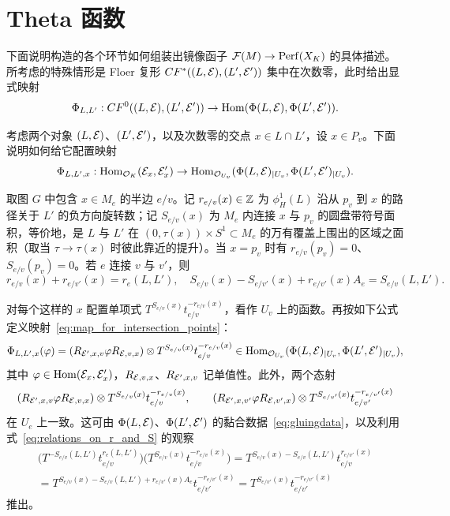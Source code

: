 \section{Theta 函数}\label{ss:theta}

下面说明构造的各个环节如何组装出镜像函子 $\mathcal{F}(M)\to \operatorname{Perf}(X_K)$ 的具体描述。所考虑的特殊情形是 Floer 复形 $CF^*((L,\mathcal{E}),(L',\mathcal{E}'))$ 集中在次数零，此时给出显式映射
\begin{equation}\label{eq:theta}
\Phi_{L,L'}:CF^0((L,\mathcal{E}),(L',\mathcal{E}'))\to \operatorname{Hom}(\Phi(L,\mathcal{E}),\Phi(L',\mathcal{E}')).
\end{equation}

考虑两个对象 $(L,\mathcal{E})$、$(L',\mathcal{E}')$，以及次数零的交点 $x\in L\cap L'$，设 $x\in P_v$。下面说明如何给它配置映射
\begin{equation}\label{eq:map_for_intersection_points}
\Phi_{L,L',x}:\operatorname{Hom}_{\mathcal{O}_K}(\mathcal{E}_x,\mathcal{E}'_x)\to \operatorname{Hom}_{\mathcal{O}_{U_v}}(\Phi(L,\mathcal{E})_{\mid U_v},\Phi(L',\mathcal{E}')_{\mid U_v}).
\end{equation}

取图 $G$ 中包含 $x\in M_e$ 的半边 $e/v$。记 $r_{e/v}(x)\in \mathbb{Z}$ 为 $\phi_H^1(L)$ 沿从 $p_v$ 到 $x$ 的路径关于 $L'$ 的负方向旋转数；记 $S_{e/v}(x)$ 为 $M_e$ 内连接 $x$ 与 $p_v$ 的圆盘带符号面积，等价地，是 $L$ 与 $L'$ 在 $(0,\tau(x))\times S^1\subset M_e$ 的万有覆盖上围出的区域之面积（取当 $\tau\to\tau(x)$ 时彼此靠近的提升）。当 $x=p_v$ 时有 $r_{e/v}(p_v)=0$、$S_{e/v}(p_v)=0$。若 $e$ 连接 $v$ 与 $v'$，则
\begin{equation}\label{eq:relations_on_r_and_S}
r_{e/v}(x)+r_{e/v'}(x)=r_{e}(L,L'),\quad
S_{e/v}(x)-S_{e/v'}(x)+r_{e/v'}(x)A_e=S_{e/v}(L,L').
\end{equation}

对每个这样的 $x$ 配置单项式 $T^{S_{e/v}(x)}t_{e/v}^{-r_{e/v}(x)}$，看作 $U_v$ 上的函数。再按如下公式定义映射~\eqref{eq:map_for_intersection_points}：
\begin{equation}\label{eq:monomial_for_a_point}
\Phi_{L,L',x}(\varphi)=(R_{\mathcal{E}',x,v}\varphi R_{\mathcal{E},v,x})\otimes T^{S_{e/v}(x)}t_{e/v}^{-r_{e/v}(x)}\in \operatorname{Hom}_{\mathcal{O}_{U_v}}(\Phi(L,\mathcal{E})_{\mid U_v},\Phi(L',\mathcal{E}')_{\mid U_v}),
\end{equation}
其中 $\varphi\in\operatorname{Hom}(\mathcal{E}_x,\mathcal{E}'_x)$，$R_{\mathcal{E},v,x}$、$R_{\mathcal{E}',x,v}$ 记单值性。此外，两个态射
\[
(R_{\mathcal{E}',x,v}\varphi R_{\mathcal{E},v,x})\otimes T^{S_{e/v}(x)}t_{e/v}^{-r_{e/v}(x)},\qquad
(R_{\mathcal{E}',x,v'}\varphi R_{\mathcal{E},v',x})\otimes T^{S_{e/v'}(x)}t_{e/v'}^{-r_{e/v'}(x)}
\]
在 $U_e$ 上一致。这可由 $\Phi(L,\mathcal{E})$、$\Phi(L',\mathcal{E}')$ 的黏合数据~\eqref{eq:gluingdata}，以及利用式~\eqref{eq:relations_on_r_and_S} 的观察
\begin{multline*}
\bigl(T^{-S_{e/v}(L,L')}t_{e/v}^{r_e(L,L')}\bigr)\bigl(T^{S_{e/v}(x)}t_{e/v}^{-r_{e/v}(x)}\bigr)
=T^{S_{e/v}(x)-S_{e/v}(L,L')}t_{e/v}^{r_{e/v'}(x)}\\
=T^{S_{e/v}(x)-S_{e/v}(L,L')+r_{e/v'}(x)A_e}t_{e/v'}^{-r_{e/v'}(x)}
=T^{S_{e/v'}(x)}t_{e/v'}^{-r_{e/v'}(x)}
\end{multline*}
推出。

